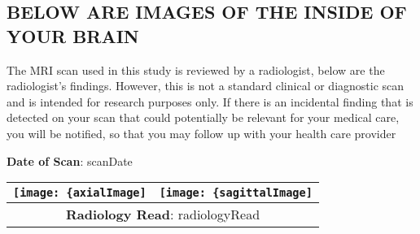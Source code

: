 \subsection{BELOW ARE IMAGES OF THE INSIDE OF YOUR BRAIN}

The MRI scan used in this study is reviewed by a radiologist, below are the
radiologist's findings. However, this is not a standard clinical or diagnostic
scan and is intended for research purposes only. If there is an incidental
finding that is detected on your scan that could potentially be relevant for
your medical care, you will be notified, so that you may follow up with your
health care provider

\textbf{Date of Scan}: {{scanDate}}

\setlength{\arrayrulewidth}{0.65mm}

\begin{table}[h!]
    \centering
    \begin{tabular}{cc}
        \texttt{[image: \{axialImage]}} & \texttt{[image: \{sagittalImage]}}
        \\ \hline
        \multicolumn{2}{c}{\parbox{0.8\textwidth}{\raggedright \vspace*{5mm} \textbf{Radiology Read}: {{radiologyRead}} \vspace*{5mm}}} 
        \\ \hline
    \end{tabular}
\end{table}
